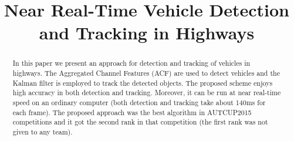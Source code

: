 \documentclass[conference]{IEEEtran}
\begin{document}
%
\title{Near Real-Time Vehicle Detection and Tracking in Highways}


\author{
\and
{}
\and
{}
}



\maketitle


\begin{abstract}
	In this paper we present an approach for detection and tracking of vehicles in highways. The Aggregated Channel Features (ACF) are used to detect vehicles and the Kalman filter is employed to track the detected objects. The proposed scheme enjoys high accuracy in both detection and tracking. Moreover, it can be run at near real-time speed on an ordinary computer (both detection and tracking take about 140ms for each frame). The proposed approach was the best algorithm in AUTCUP2015 competitions and it got the second rank in that competition (the first rank was not given to any team).
\end{abstract}





%
\IEEEpeerreviewmaketitle
\end{document}
